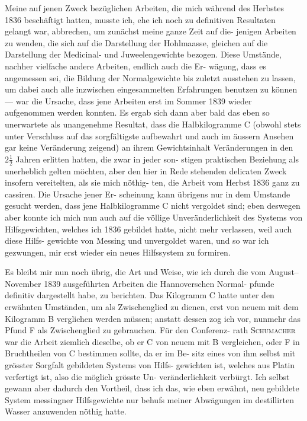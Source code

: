 \documentclass[12pt,a4paper]{article}
\theoremstyle{plain}
\theoremstyle{definition}
\theoremstyle{remark}
\begin{document}
Meine auf jenen Zweck bez\"uglichen Arbeiten, die mich w\"ahrend des
Herbstes 1836 besch\"aftigt hatten, musste ich, ehe ich noch zu definitiven
Resultaten gelangt war, abbrechen, um zun\"achst meine ganze Zeit auf die-
jenigen Arbeiten zu wenden, die sich auf die Darstellung der Hohlmaasse,
gleichen auf die Darstellung der Medicinal- und Juweelengewichte bezogen.
Diese Umst\"ande, nachher vielfache andere Arbeiten, endlich auch die Er-
w\"agung, dass es angemessen sei, die Bildung der Normalgewichte bis zuletzt
ausstehen zu lassen, um dabei auch alle inzwischen eingesammelten Erfahrungen
benutzen zu k\"onnen --- war die Ursache, dass jene Arbeiten erst im Sommer
1839 wieder aufgenommen werden konnten. Es ergab sich dann aber bald
das eben so unerwartete als unangenehme Resultat, dass die Halbkilogramme
C (obwohl stets unter Verschluss auf das sorgf\"altigste aufbewahrt und auch
im \"aussern Ansehen gar keine Ver\"anderung zeigend) an ihrem Gewichtsinhalt
Ver\"anderungen in den $2\frac{1}{2}$ Jahren erlitten hatten, die zwar in jeder son-
stigen praktischen Beziehung als unerheblich gelten m\"ochten, aber den hier
in Rede stehenden delicaten Zweck insofern vereitelten, als sie mich n\"othig-
ten, die Arbeit vom Herbst 1836 ganz zu cassiren. Die Ursache jener Er-
scheinung kann \"ubrigens nur in dem Umstande gesucht werden, dass jene
Halbkilogramme C nicht vergoldet sind; eben deswegen aber konnte ich mich
nun auch auf die v\"ollige Unver\"anderlichkeit des Systems von Hilfsgewichten,
welches ich 1836 gebildet hatte, nicht mehr verlassen, weil auch diese Hilfs-
gewichte von Messing und unvergoldet waren, und so war ich gezwungen, mir
erst wieder ein neues Hilfssystem zu formiren.

Es bleibt mir nun noch \"ubrig, die Art und Weise, wie ich durch die
vom August--November 1839 ausgef\"uhrten Arbeiten die Hannoverschen Normal-
pfunde definitiv dargestellt habe, zu berichten. Das Kilogramm C hatte unter
den erw\"ahnten Umst\"anden, um als Zwischenglied zu dienen, erst von neuem
mit dem Kilogramm B verglichen werden m\"ussen; anstatt dessen zog ich vor,
nunmehr das Pfund F als Zwischenglied zu gebrauchen. F\"ur den Conferenz-
rath \textsc{Schumacher} war die Arbeit ziemlich dieselbe, ob er C von neuem mit
B vergleichen, oder F in Bruchtheilen von C bestimmen sollte, da er im Be-
sitz eines von ihm selbst mit gr\"osster Sorgfalt gebildeten Systems von Hilfs-
gewichten ist, welches aus Platin verfertigt ist, also die m\"oglich gr\"osste Un-
ver\"anderlichkeit verb\"urgt. Ich selbst gewann aber dadurch den Vortheil, dass
ich das, wie eben erw\"ahnt, neu gebildete System messingner Hilfsgewichte
nur behufs meiner Abw\"agungen im destillirten Wasser anzuwenden n\"othig
hatte.
\end{document}
